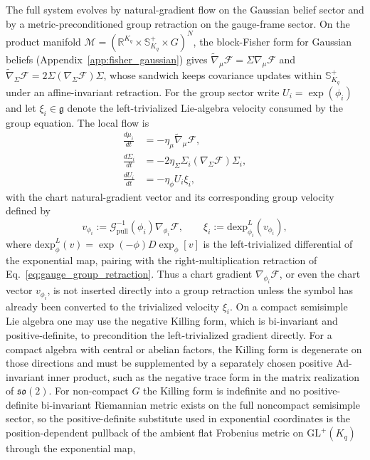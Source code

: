 \documentclass[11pt]{article}
\begin{document}
The full system evolves by natural-gradient flow on the Gaussian belief sector and by a metric-preconditioned group retraction on the gauge-frame sector. On the product manifold $\mathcal{M} = (\mathbb{R}^{K_q} \times \mathbb{S}^+_{K_q} \times G)^N$, the block-Fisher form for Gaussian beliefs (Appendix~\ref{app:fisher_gaussian}) gives $\tilde\nabla_\mu\mathcal{F} = \Sigma\nabla_\mu\mathcal{F}$ and $\tilde\nabla_\Sigma\mathcal{F} = 2\Sigma(\nabla_\Sigma\mathcal{F})\Sigma$, whose sandwich keeps covariance updates within $\mathbb{S}^+_{K_q}$ under an affine-invariant retraction. For the group sector write $U_i = \exp(\phi_i)$ and let $\xi_i \in \mathfrak{g}$ denote the left-trivialized Lie-algebra velocity consumed by the group equation. The local flow is
\begin{align}
\frac{d\mu_i}{dt} &= -\eta_\mu \tilde{\nabla}_\mu \mathcal{F}, \\
\frac{d\Sigma_i}{dt} &= -2\eta_\Sigma \Sigma_i (\nabla_\Sigma \mathcal{F}) \Sigma_i, \\
\frac{dU_i}{dt} &= -\eta_\phi U_i \xi_i,
\label{eq:gauge_natural_gradient}
\end{align}
with the chart natural-gradient vector and its corresponding group velocity defined by
\begin{equation}
v_{\phi_i} := \mathcal{G}_{\mathrm{pull}}^{-1}(\phi_i) \nabla_{\phi_i} \mathcal{F},
\qquad
\xi_i := \mathrm{dexp}_{\phi_i}^{L}(v_{\phi_i}),
\label{eq:gauge_natural_gradient_def}
\end{equation}
where $\mathrm{dexp}_{\phi}^{L}(v) = \exp(-\phi)D\exp_{\phi}[v]$ is the left-trivialized differential of the exponential map, pairing with the right-multiplication retraction of Eq.~\eqref{eq:gauge_group_retraction}. Thus a chart gradient $\nabla_{\phi_i}\mathcal{F}$, or even the chart vector $v_{\phi_i}$, is not inserted directly into a group retraction unless the symbol has already been converted to the trivialized velocity $\xi_i$. On a compact semisimple Lie algebra one may use the negative Killing form, which is bi-invariant and positive-definite, to precondition the left-trivialized gradient directly. For a compact algebra with central or abelian factors, the Killing form is degenerate on those directions and must be supplemented by a separately chosen positive Ad-invariant inner product, such as the negative trace form in the matrix realization of $\mathfrak{so}(2)$. For non-compact $G$ the Killing form is indefinite and no positive-definite bi-invariant Riemannian metric exists on the full noncompact semisimple sector, so the positive-definite substitute used in exponential coordinates is the position-dependent pullback of the ambient flat Frobenius metric on $\mathrm{GL}^+(K_q)$ through the exponential map,
\end{document}
